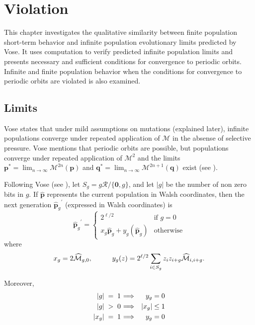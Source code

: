 \chapter{Violation} \label{ch:evolutionary limits}
This chapter investigates the qualitative similarity between finite population short-term behavior and infinite population evolutionary limits 
predicted by Vose. 
It uses computation to verify predicted infinite population limits and presents necessary and sufficient conditions for 
convergence to periodic orbits. Infinite and finite population behavior when 
the conditions for convergence to periodic orbits are violated is also examined.

\section{Limits}
\label{Limits}
Vose states that under mild assumptions on mutations (explained later), infinite populations converge under repeated application 
of $\mathcal{M}$ in the absense of selective pressure. Vose mentions that periodic orbits are possible, but populations converge under 
repeated application of $\mathcal{M}^2$ and the limits $\bm{p}^\ast = \lim_{n \rightarrow \infty} \mathcal{M}^{2n}({\bm p})$ 
and ${\bm q}^\ast = \lim_{n \rightarrow \infty} \mathcal{M}^{2n+1}({\bm q})$ exist (see \cite{Vose1999}).

Following Vose (see \cite{Vose1999}), let $S_g = g \mathcal{R} / \{\textbf{0}, g\}$, and let $|g|$ be the number of non zero bits in $g$. 
If $\widehat{\bm{p}}$ represents the current population in Walsh coordinates, then the next generation ${\widehat{\bm{p}}_g}^{\prime}$ 
(expressed in Walsh coordinates) is 
\[
{{\widehat{\bm{p}}}_g}^{\prime}  = \begin{cases}
    2^{\ell /2}  & \text{if $g = 0$}\\
    x_g \widehat{{\bm p}}_g + y_g(\widehat{{\bm p}}_g) & \text{otherwise}
  \end{cases}
\]
where
\[
x_g = 2\widehat{\mathcal{M}}_{g,0},  \hspace*{1cm} y_g(z) = 2^{\ell /2} \sum_{i \in S_g} z_i z_{i+g} \widehat{\mathcal{M}}_{i,i+g}.
\]

Moreover, 
\begin{eqnarray*}
|g| \;=\; 1 \hspace{0.01in} & \Longrightarrow & y_g = 0 \\
|g| \;>\; 0 \hspace{0.01in} & \Longrightarrow & |x_g| \leq 1 \\
|x_g| \;=\; 1 \hspace{0.01in} & \Longrightarrow & y_g = 0
\end{eqnarray*}

